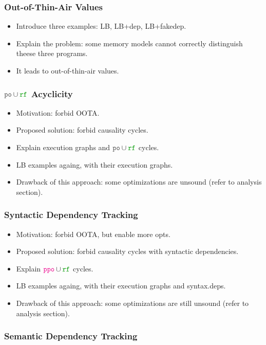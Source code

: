 \subsubsection{Out-of-Thin-Air Values}
\label{sec:bgrnd-oota}

\begin{itemize}
  \item Introduce three examples: LB, LB+dep, LB+fakedep.
  \item Explain the problem: some memory models cannot 
    correctly distinguish theese three programs.
  \item It leads to out-of-thin-air values.
\end{itemize}

\subsubsection{$\lPO\cup\lRF$ Acyclicity}

\begin{itemize}
  \item Motivation: forbid OOTA.
  \item Proposed solution: forbid causality cycles. 
  \item Explain execution graphs and $\lPO\cup\lRF$ cycles.
  \item LB examples againg, with their execution graphs.
  \item Drawback of this approach: some optimizations are unsound 
    (refer to analysis section).
\end{itemize}

\subsubsection{Syntactic Dependency Tracking}

\begin{itemize}
  \item Motivation: forbid OOTA, but enable more opts.
  \item Proposed solution: forbid causality cycles with syntactic dependencies. 
  \item Explain $\lPPO\cup\lRF$ cycles.
  \item LB examples againg, with their execution graphs and syntax.deps.
  \item Drawback of this approach: some optimizations are still unsound 
    (refer to analysis section).
\end{itemize}

\subsubsection{Semantic Dependency Tracking}

